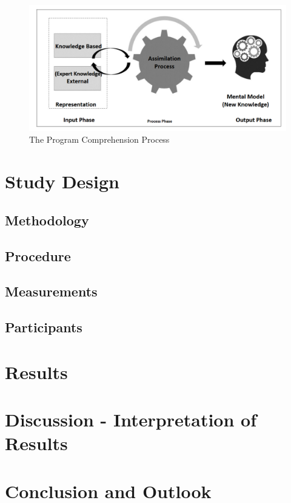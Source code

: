 \begin{figure}
  \centering
  \includegraphics[width=\textwidth]{figures/program_Comprehension_Process.png}
  \caption{The Program Comprehension Process}
  \label{fig:AnhangsChor}
\end{figure}



\chapter{Study Design}

\section{Methodology}

\section{Procedure}

\section{Measurements}

\section{Participants}

\chapter{Results}

\chapter{Discussion - Interpretation of Results}

\chapter{Conclusion and Outlook}
\label{sec:conclusion}

